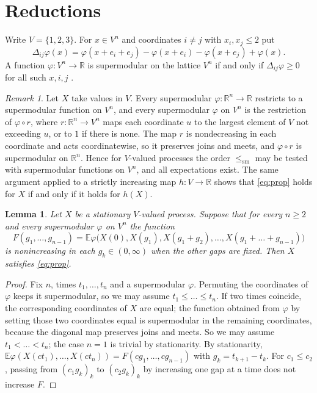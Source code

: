 \documentclass[11pt]{amsart}
\newtheorem{lemma}[theorem]{Lemma}
\theoremstyle{remark}
\newtheorem{remark}[theorem]{Remark}
\numberwithin{equation}{section}
\newcommand{\E}{\mathbb E}
\newcommand{\R}{\mathbb R}
\newcommand{\1}{\mathbf 1}
\newcommand{\sm}{\mathrm{sm}}
\begin{document}
\section{Reductions}\label{sec:prelim}

Write $V=\{1,2,3\}$. For $x\in V^n$ and coordinates $i\ne j$ with $x_i,x_j\le2$ put
\[
\Delta_{ij}\varphi(x)=\varphi(x+e_i+e_j)-\varphi(x+e_i)-\varphi(x+e_j)+\varphi(x).
\]
A function $\varphi\colon V^n\to\R$ is supermodular on the lattice $V^n$ if and only if $\Delta_{ij}\varphi\ge0$ for all such $x,i,j$ \cite{Top}.

\begin{remark}\label{rem:relabel}
Let $X$ take values in $V$. Every supermodular $\varphi\colon\R^n\to\R$ restricts to a supermodular function on $V^n$, and every supermodular $\varphi$ on $V^n$ is the restriction of $\varphi\circ r$, where $r\colon\R^n\to V^n$ maps each coordinate $u$ to the largest element of $V$ not exceeding $u$, or to $1$ if there is none. The map $r$ is nondecreasing in each coordinate and acts coordinatewise, so it preserves joins and meets, and $\varphi\circ r$ is supermodular on $\R^n$. Hence for $V$-valued processes the order $\le_\sm$ may be tested with supermodular functions on $V^n$, and all expectations exist. The same argument applied to a strictly increasing map $h\colon V\to\R$ shows that \eqref{eq:prop} holds for $X$ if and only if it holds for $h(X)$.
\end{remark}

\begin{lemma}\label{lem:gaps}
Let $X$ be a stationary $V$-valued process. Suppose that for every $n\ge2$ and every supermodular $\varphi$ on $V^n$ the function
\[
F(g_1,\dots,g_{n-1})=\E\varphi\bigl(X(0),X(g_1),X(g_1+g_2),\dots,X(g_1+\dots+g_{n-1})\bigr)
\]
is nonincreasing in each $g_k\in(0,\infty)$ when the other gaps are fixed. Then $X$ satisfies \eqref{eq:prop}.
\end{lemma}

\begin{proof}
Fix $n$, times $t_1,\dots,t_n$ and a supermodular $\varphi$. Permuting the coordinates of $\varphi$ keeps it supermodular, so we may assume $t_1\le\dots\le t_n$. If two times coincide, the corresponding coordinates of $X$ are equal; the function obtained from $\varphi$ by setting those two coordinates equal is supermodular in the remaining coordinates, because the diagonal map preserves joins and meets. So we may assume $t_1<\dots<t_n$; the case $n=1$ is trivial by stationarity. By stationarity, $\E\varphi(X(ct_1),\dots,X(ct_n))=F(cg_1,\dots,cg_{n-1})$ with $g_k=t_{k+1}-t_k$. For $c_1\le c_2$, passing from $(c_1g_k)_k$ to $(c_2g_k)_k$ by increasing one gap at a time does not increase $F$.
\end{proof}
\end{document}
